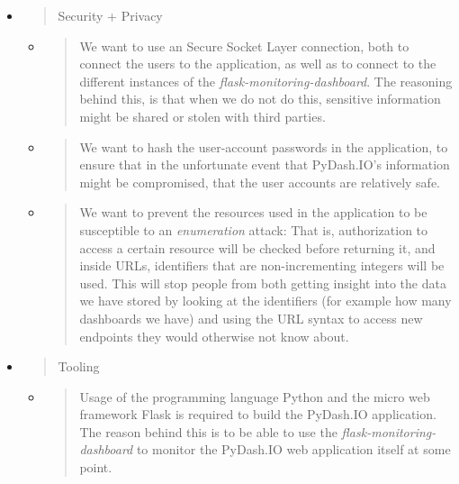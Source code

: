 \begin{itemize}
\item
  \begin{quote}
  Security + Privacy
  \end{quote}

  \begin{itemize}
  \item
    \begin{quote}
    We want to use an Secure Socket Layer connection, both to connect
    the users to the application, as well as to connect to the different
    instances of the \emph{flask-monitoring-dashboard}. The reasoning
    behind this, is that when we do not do this, sensitive information
    might be shared or stolen with third parties.
    \end{quote}
  \item
    \begin{quote}
    We want to hash the user-account passwords in the application, to
    ensure that in the unfortunate event that PyDash.IO's information
    might be compromised, that the user accounts are relatively safe.
    \end{quote}
  \item
    \begin{quote}
    We want to prevent the resources used in the application to be
    susceptible to an \emph{enumeration} attack: That is, authorization
    to access a certain resource will be checked before returning it,
    and inside URLs, identifiers that are non-incrementing integers will
    be used. This will stop people from both getting insight into the
    data we have stored by looking at the identifiers (for example how
    many dashboards we have) and using the URL syntax to access new
    endpoints they would otherwise not know about.
    \end{quote}
  \end{itemize}
\item
  \begin{quote}
  Tooling
  \end{quote}

  \begin{itemize}
  \item
    \begin{quote}
    Usage of the programming language Python and the micro web framework
    Flask is required to build the PyDash.IO application. The reason
    behind this is to be able to use the
    \emph{flask-monitoring-dashboard} to monitor the PyDash.IO web
    application itself at some point.
    \end{quote}
  \end{itemize}
\end{itemize}

